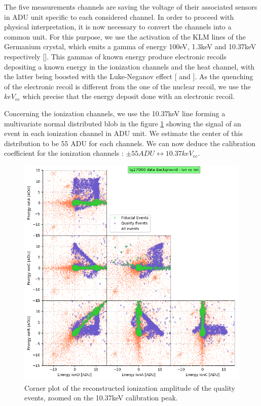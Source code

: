 The five measurements channels are saving the voltage of their associated sensors in ADU unit specific to each considered channel. In order to proceed with physical interpretation, it is now necessary to convert the channels into a common unit.
For this purpose, we use the activation of the KLM lines of the Germanium crystal, which emits a gamma of energy 100eV, 1.3keV and 10.37keV respectively [\cite{germanium-decay}]. This gammas of known energy produce electronic recoils depositing a known energy in the ionization channels and the heat channel, with the latter being boosted with the Luke-Neganov effect [\cite{luke-neganov-effect} and \citep{luke-neganov-interpretation}]. As the quenching of the electronic recoil is different from the one of the nuclear recoil, we use the $keV_{ee}$ which precise that the energy deposit done with an electronic recoil.

Concerning the ionization channels, we use the 10.37keV line forming a multivariate normal distributed blob in the figure \ref{fig:calibration-ion} showing the signal of an event in each ionization channel in ADU unit. We estimate the center of this distribution to be $55$ ADU for each channels. We can now deduce the calibration coefficient for the ionization channels : $\pm 55 ADU \leftrightarrow 10.37 keV_{ee}$.

\begin{figure}
\centering
\includegraphics[width=\linewidth,]{Figures/Neutron/calibration_ion.png}
\caption{Corner plot of the reconstructed ionization amplitude of the quality events, zoomed on the 10.37keV calibration peak.}
\label{fig:calibration-ion}
\end{figure}

